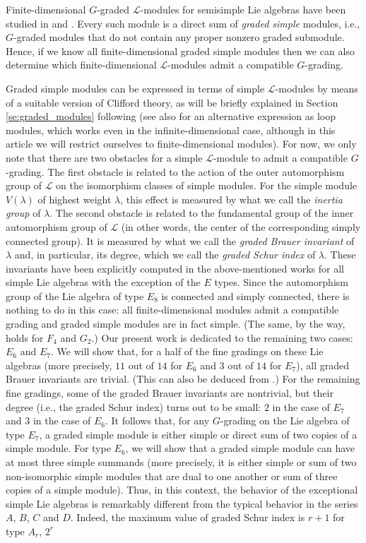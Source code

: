 \documentclass[a4paper,reqno]{amsart}
\theoremstyle{definition}
\numberwithin{theorem}{section}
\numberwithin{equation}{section}
\begin{document}
Finite-dimensional $G$-graded ${\mathcal{L}}$-modules for semisimple Lie algebras have been studied in \cite{EK_Israel} and \cite[Appendix~A]{EK_D4}. Every such module is a direct sum of \emph{graded simple} modules, i.e., $G$-graded modules that do not contain any proper nonzero graded submodule. Hence, if we know all finite-dimensional graded simple modules then we can also determine which finite-dimensional ${\mathcal{L}}$-modules admit a compatible $G$-grading. 

Graded simple modules can be expressed in terms of simple ${\mathcal{L}}$-modules by means of a suitable version of Clifford theory, as will be briefly explained in Section \ref{se:graded_modules} following \cite{EK_Israel,EK_D4} (see also \cite{MZ,EK_loop} for an alternative expression as loop modules, which works even in the infinite-dimensional case, although in this article we will restrict ourselves to finite-dimensional modules). For now, we only note that there are two obstacles for a simple ${\mathcal{L}}$-module to admit a compatible $G$-grading. The first obstacle is related to the action of the outer automorphism group of ${\mathcal{L}}$ on the isomorphism classes of simple modules. For the simple module $V(\lambda)$ of highest weight $\lambda$, this effect is measured by what we call the \emph{inertia group} of $\lambda$. The second obstacle is related to the fundamental group of the inner automorphism group of ${\mathcal{L}}$ (in other words, the center of the corresponding simply connected group). It is measured by what we call the \emph{graded Brauer invariant} of $\lambda$ and, in particular, its degree, which we call the \emph{graded Schur index} of $\lambda$. These invariants have been explicitly computed in the above-mentioned works for all simple Lie algebras with the exception of the $E$ types. Since the automorphism group of the Lie algebra of type $E_8$ is connected and simply connected, there is nothing to do in this case: all finite-dimensional modules admit a compatible grading and graded simple modules are in fact simple. (The same, by the way, holds for $F_4$ and $G_2$.) Our present work is dedicated to the remaining two cases: $E_6$ and $E_7$. We will show that, for a half of the fine gradings on these Lie algebras (more precisely, $11$ out of $14$ for $E_6$ and $3$ out of $14$ for $E_7$), all graded Brauer invariants are trivial. (This can also be deduced from \cite{Yu_E}.) For the remaining fine gradings, some of the graded Brauer invariants are nontrivial, but their degree (i.e., the graded Schur index) turns out to be small: $2$ in the case of $E_7$ and $3$ in the case of $E_6$. It follows that, for any $G$-grading on the Lie algebra of type $E_7$, a graded simple module is either simple or direct sum of two copies of a simple module. For type $E_6$, we will show that a graded simple module can have at most three simple summands (more precisely, it is either simple or sum of two non-isomorphic simple modules that are dual to one another or sum of three copies of a simple module). Thus, in this context, the  behavior of the exceptional simple Lie algebras is remarkably different from the typical behavior in the series $A$, $B$, $C$ and $D$. Indeed, the maximum value of graded Schur index is $r+1$ for type $A_r$, $2^r$ 
\end{document}
